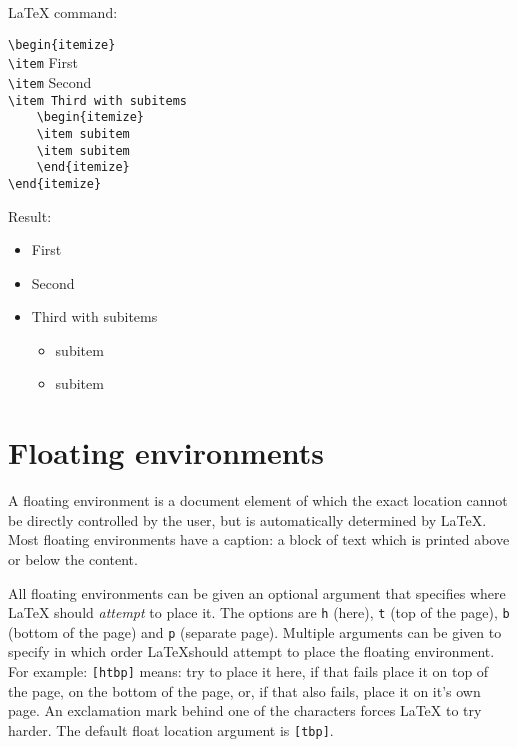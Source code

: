 \documentclass{article}
\begin{document}
\begin{minipage}[t]{0.5\textwidth}
{\LaTeX} command:
\vspace{3mm}

\verb|\begin{itemize}|\\
\verb|\item| First\\
\verb|\item| Second\\
\verb|\item Third with subitems|\\
\verb|    \begin{itemize}|\\
\verb|    \item subitem|\\
\verb|    \item subitem|\\
\verb|    \end{itemize}|\\
\verb|\end{itemize}|\\
\end{minipage}
\begin{minipage}[t]{0.5\textwidth}
Result:

\begin{itemize}
\item First
\item Second
\item Third with subitems
	\begin{itemize}
	\item subitem
	\item subitem
	\end{itemize}
\end{itemize}
\end{minipage}

\section{Floating environments}

A floating environment is a document element of which the exact location cannot be directly controlled by the user, but is automatically determined by \LaTeX. Most floating environments have a caption: a block of text which is printed above or below the content.

All floating environments can be given an optional argument that specifies where \LaTeX{} should \mbox{\emph{attempt}} to place it. The options are \verb|h| (here), \verb|t| (top of the page), \verb|b| (bottom of the page) and \verb|p| (separate page). Multiple arguments can be given to specify in which order \LaTeX should attempt to place the floating environment. For example: \verb|[htbp]| means: try to place it here, if that fails place it on top of the page, on the bottom of the page, or, if that also fails, place it on it's own page. An exclamation mark behind one of the characters forces \LaTeX{} to try harder. The default float location argument is \verb|[tbp]|.
\end{document}
